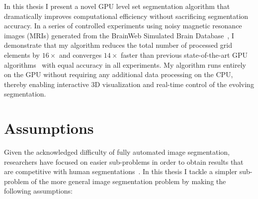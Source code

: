 In this thesis I present a novel GPU level set segmentation algorithm that dramatically improves computational efficiency without sacrificing segmentation accuracy. In a series of controlled experiments using noisy magnetic resonance images (MRIs) generated from the BrainWeb Simulated Brain Database~\cite{BrainWeb-2010,Kwan-1996,Cocosco-1997,Collins-1998,Kwan-1999}, I demonstrate that my algorithm reduces the total number of processed grid elements by $16 \times$ and converges $14 \times$ faster than previous state-of-the-art GPU algorithms~\cite{Lefohn-2003-Vis,Lefohn-2003-MICCAI,Lefohn-2004,Cates-2004} with equal accuracy in all experiments. My algorithm runs entirely on the GPU without requiring any additional data processing on the CPU, thereby enabling interactive 3D visualization and real-time control of the evolving segmentation.

\section{Assumptions}

Given the acknowledged difficulty of fully automated image segmentation, researchers have focused on easier sub-problems in order to obtain results that are competitive with human segmentations~\cite{Szeliski-2010}. In this thesis I tackle a simpler sub-problem of the more general image segmentation problem by making the following assumptions:


